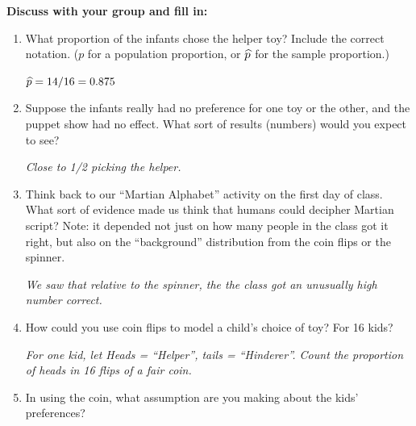 {\bf Discuss with your group and fill in:	}\vspace{-.3cm}
\begin{enumerate}
  \item  What proportion of the infants chose the helper toy? Include
    the correct notation. ($p$ for a population proportion, or
    $\widehat{p}$ for the sample proportion.)
\begin{students}
     \vspace{1cm}
\end{students}

\begin{key}
     {\it  $\widehat{p} = 14/16 = 0.875$ }
\end{key}
\item  
     Suppose the infants really had no preference for one toy or the other,
     and the puppet show had no effect.  What sort of results
     (numbers) would     you expect to see?
\begin{students}
       \vspace{1cm}
\end{students}

\begin{key}
       {\it  Close to 1/2 picking the helper.}
\end{key}

   \item Think back to our ``Martian Alphabet'' activity on the first day of
     class.  What sort of evidence made us think that humans could
     decipher Martian script?  Note:  it depended not just on how many
     people in the class got it right, but also on 
     the ``background'' distribution from the coin flips or the spinner.
\begin{students}
  \vspace{2cm}
\end{students}

\begin{key}
       {\it   We saw that relative to the spinner, the the class got
         an unusually high number correct.}
\end{key}
 
   \item How could you use coin flips to model a child's choice of
     toy? For 16 kids?
\begin{students}
  \vspace{2cm}
\end{students}

\begin{key}
       {\it  For one kid, let Heads = ``Helper'', tails =
         ``Hinderer''.  Count the proportion of heads in 16 flips of a
         fair coin.} 
\end{key}
   \item In using the coin, what assumption are you making about the
     kids' preferences? 
\begin{students}
  \vspace*{2cm}
\end{students}


\end{enumerate}
